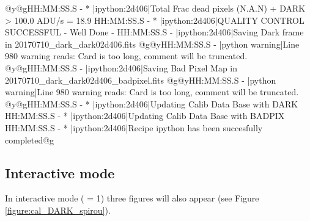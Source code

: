 \begin{cmdboxprintspecial}
@y@gHH:MM:SS.S - * |ipython:2d406|Total Frac dead pixels (N.A.N) + DARK > 100.0 ADU/s = 18.9 %
HH:MM:SS.S - * |ipython:2d406|QUALITY CONTROL SUCCESSFUL - Well Done -
HH:MM:SS.S -   |ipython:2d406|Saving Dark frame in 20170710_dark_dark02d406.fits
@g@yHH:MM:SS.S - \@ |python warning|Line 980 warning reads: Card is too long, comment will be truncated.
@y@gHH:MM:SS.S -   |ipython:2d406|Saving Bad Pixel Map in 20170710_dark_dark02d406_badpixel.fits
@g@yHH:MM:SS.S - \@ |python warning|Line 980 warning reads: Card is too long, comment will be truncated.
@y@gHH:MM:SS.S - * |ipython:2d406|Updating Calib Data Base with DARK
HH:MM:SS.S - * |ipython:2d406|Updating Calib Data Base with BADPIX
HH:MM:SS.S - * |ipython:2d406|Recipe ipython has been succesfully completed@g
\end{cmdboxprintspecial}


\newpage
\subsection{Interactive mode}


\noindent In interactive mode ( = 1) three figures will also appear (see Figure \ref{figure:cal_DARK_spirou}).


